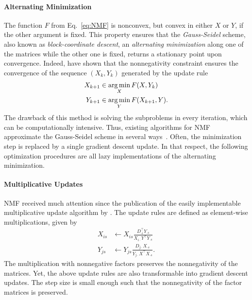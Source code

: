 \paragraph{Alternating Minimization}
The function $F$ from Eq.~\eqref{eq:NMF} is nonconvex, but convex in either $X$ or $Y$, if the other argument is fixed. This property ensures that the \emph{Gauss-Seidel} scheme, also known as \emph{block-coordinate descent}, an \emph{alternating minimization} along one of the matrices while the other one is fixed, returns a stationary point upon convergence. Indeed, \cite{grippo2000convergence} have shown that the nonnegativity constraint ensures the convergence of the sequence $(X_k,Y_k)$ generated by the update rule
\begin{align}\label{eq:als}
\begin{split}
X_{k+1} &\in \operatorname*{arg\,min}_{X} F(X,Y_k)\\
Y_{k+1} &\in \operatorname*{arg\,min}_{Y} F(X_{k+1},Y).
\end{split}
\end{align}
The drawback of this method is solving the subproblems in every iteration, which can be computationally intensive. Thus, existing algorithms for NMF approximate the Gauss-Seidel scheme in several ways~\citep{wang2013nonnegative}. Often, the minimization step is replaced by a single gradient descent update. In that respect, the following optimization procedures are all lazy implementations of the alternating minimization.
%
\paragraph{Multiplicative Updates}
NMF received much attention since the publication of the easily implementable multiplicative update algorithm by \cite{lee2001algorithms}. The update rules are defined as element-wise multiplications, given by
\begin{align}
X_{is} &\leftarrow X_{is} \frac{D_{\cdot i}^\top Y_{\cdot s}}{X_{i\cdot}Y^\top Y_{\cdot s}}\label{eq:multUpdateX}\\
Y_{js} &\leftarrow Y_{js}\frac{D_{j\cdot}X_{\cdot s}}{Y_{j\cdot}X^\top X_{\cdot s}}. \label{eq:multUpdateY} 
\end{align}
The multiplication with nonnegative factors preserves the nonnegativity of the matrices. Yet, the above update rules are also transformable into gradient descent updates. The step size is small enough such that the nonnegativity of the factor matrices is preserved.

